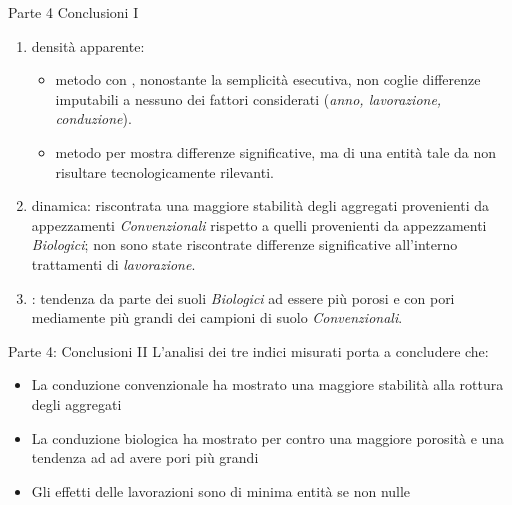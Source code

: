 \documentclass[10pt]{beamer}
\begin{document}
\begin{frame}[label=finale]{Parte 4 \small{Conclusioni I}}
  \begin{enumerate}[<+->]

  \item densità apparente:
    \begin{itemize}
    \item metodo con \hyperlink{Core}{}, nonostante la semplicità esecutiva,
      non coglie differenze imputabili a nessuno dei fattori considerati
      (\emph{anno, lavorazione, conduzione}).
    \item metodo per \hyperlink{Clod}{} mostra differenze significative, ma di
      una entità tale da non risultare tecnologicamente rilevanti.
    \end{itemize}
  \item \hyperlink{distribuzione}{} dinamica: riscontrata una
    maggiore stabilità degli aggregati provenienti da appezzamenti
    \emph{Convenzionali} rispetto a quelli provenienti da appezzamenti
    \emph{Biologici}; non sono state riscontrate differenze significative
    all'interno trattamenti di \emph{lavorazione}.
  \item \hyperlink{Porosimetria}{}: tendenza da parte dei suoli
    \emph{Biologici} ad essere più porosi e con pori mediamente più
    grandi dei campioni di suolo \emph{Convenzionali}.
  \end{enumerate}

\end{frame}

\begin{frame}{Parte 4: \small{Conclusioni II}}
L'analisi dei tre indici misurati porta a concludere che:
  \begin{itemize}[<+->]
\pause
  \item La conduzione convenzionale ha mostrato una maggiore stabilità
    alla rottura degli aggregati
  \item La conduzione biologica ha mostrato per contro una maggiore
    porosità e una tendenza ad ad avere pori più grandi
  \item Gli effetti delle lavorazioni sono di minima entità se non nulle
  \end{itemize}

\end{frame}



\begin{frame}
\end{frame}
\end{document}
